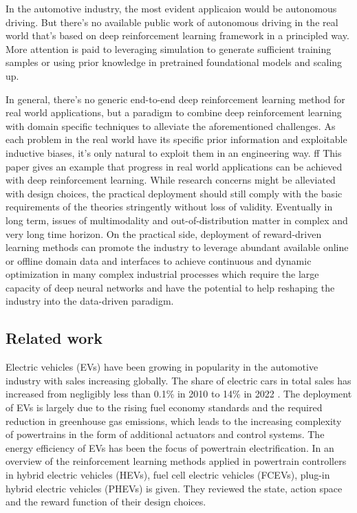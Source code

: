 \documentclass{article}
\begin{document}
In the automotive industry, the most evident applicaion would be autonomous driving. But there's no available public work of autonomous driving in the real world that's based on deep reinforcement learning framework in a principled way. More attention is paid to leveraging simulation to generate sufficient training samples or using prior knowledge in pretrained foundational models and scaling up.

In general, there's no generic end-to-end deep reinforcement learning method for real world applications, but a paradigm to combine deep reinforcement learning with domain specific techniques to alleviate the aforementioned challenges. As each problem in the real world have its specific prior information and exploitable inductive biases, it's only natural to exploit them in an engineering way.
ff
This paper gives an example that progress in real world applications can be achieved with deep reinforcement learning. While research concerns might be alleviated with design choices, the practical deployment should still comply with the basic requirements of the theories stringently without loss of validity. Eventually in long term, issues of multimodality and out-of-distribution matter in complex and very long time horizon. On the practical side, deployment of reward-driven learning methods can promote the industry to leverage abundant available online or offline domain data and interfaces to achieve continuous and dynamic optimization in many complex industrial processes which require the large capacity of deep neural networks and have the potential to help reshaping the industry into the data-driven paradigm.

\subsection{Related work}\label{sec:related}

Electric vehicles (EVs) have been growing in popularity in the automotive industry with sales increasing globally. The share of electric cars in total sales has increased from negligibly less than 0.1\% in 2010 to 14\% in 2022 \parencite{statista_2023}. The deployment of EVs is largely due to the rising fuel economy standards and the required reduction in greenhouse gas emissions, which leads to the increasing complexity of powertrains in the form of additional actuators and control systems. The energy efficiency of EVs has been the focus of powertrain electrification. In \parencite{Egan_2023} an overview of the reinforcement learning methods applied in powertrain controllers in hybrid electric vehicles (HEVs), fuel cell electric vehicles (FCEVs), plug-in hybrid electric vehicles (PHEVs) is given. They reviewed the state, action space and the reward function of their design choices.
\end{document}
